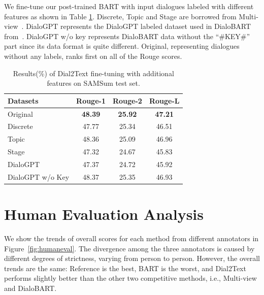 \documentclass[letterpaper]{article} %
\begin{document}
We fine-tune our post-trained BART with input dialogues labeled with different features as shown in Table \ref{tab:adddial2text}.
Discrete, Topic and Stage are borrowed from Multi-view~\cite{chen2020multi}. DialoGPT represents the DialoGPT labeled dataset used in DialoBART from~\citet{feng2021language}. DialoGPT w/o key represents DialoBART data without the ``\#KEY\#'' part since its data format is quite different. Original, representing dialogues without any labels, ranks first on all of the Rouge scores. 

\begin{table}[h]
	\centering
	\small
	\begin{tabular}{lccc}
		\toprule[1pt]
		\textbf{Datasets} & \textbf{Rouge-1} & \textbf{Rouge-2} & \textbf{Rouge-L} \\
		\midrule[1pt]
		{Original} &\textbf{48.39} &\textbf{25.92} &\textbf{47.21} \\
		{Discrete} &47.77&25.34& 46.51\\
		{Topic} &48.36&25.09&46.96 \\
		{Stage} &47.32&24.67&45.83  \\
		{DialoGPT} &47.37&24.72&45.92 \\
		{DialoGPT w/o Key} &48.37&25.35&46.93  \\
		\bottomrule[1pt]
	\end{tabular}
	\caption{Results(\%) of Dial2Text fine-tuning with additional features on SAMSum test set.}
	\label{tab:adddial2text}
\end{table}

\section{Human Evaluation Analysis}

We show the trends of overall scores for each method from different annotators in Figure~\ref{fig:humaneval}. The divergence among the three annotators is caused by different degrees of strictness, varying from person to person. However, the overall trends are the same: Reference is the best, BART is the worst, and Dial2Text performs slightly better than the other two competitive methods, i.e., Multi-view and DialoBART.
\end{document}
